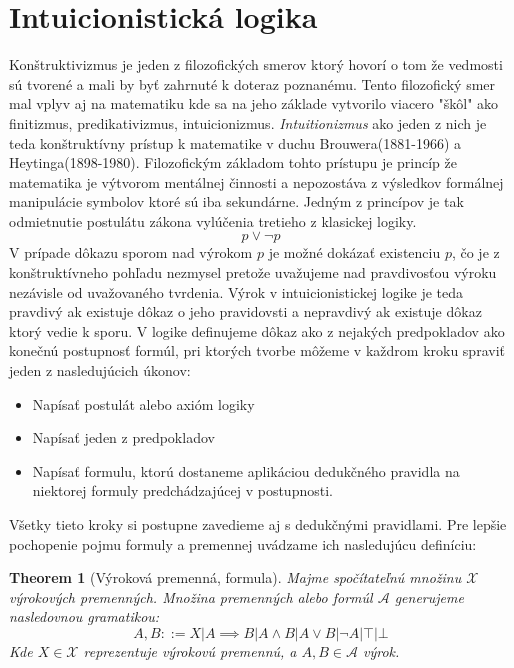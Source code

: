 \documentclass[a4paper,10pt,oneside]{report}%
\newtheorem{theorem}{Theorem}
\begin{document}
\section{Intuicionistická logika}
    Konštruktivizmus je jeden z filozofických smerov ktorý hovorí o tom že vedmosti
sú tvorené a mali by byť zahrnuté k doteraz poznanému.
    Tento filozofický smer mal vplyv aj na matematiku kde sa na jeho základe
vytvorilo viacero "škôl" ako finitizmus, predikativizmus, intuicionizmus.
    \emph{Intuitionizmus} ako jeden z nich je teda konštruktívny prístup k matematike
v duchu Brouwera(1881-1966) a Heytinga(1898-1980).
    Filozofickým základom tohto prístupu je princíp že matematika je výtvorom mentálnej
činnosti a nepozostáva z výsledkov formálnej manipulácie symbolov ktoré sú iba
sekundárne.
    Jedným z princípov je tak odmietnutie postulátu zákona vylúčenia tretieho
z klasickej logiky.
\begin{equation}
    p \vee \neg p
\end{equation}
    V prípade dôkazu sporom nad výrokom $p$ je možné dokázať existenciu $p$,
čo je z konštruktívneho pohľadu nezmysel pretože uvažujeme nad pravdivosťou
    výroku nezávisle od uvažovaného tvrdenia.
Výrok v intuicionistickej logike je teda pravdivý ak existuje dôkaz o jeho pravidovsti
a nepravdivý ak existuje dôkaz ktorý vedie k sporu.
    V logike definujeme dôkaz ako z nejakých predpokladov ako konečnú postupnosť
formúl, pri ktorých tvorbe môžeme v každrom kroku spraviť jeden z nasledujúcich
úkonov:
\begin{itemize}
    \item Napísať postulát alebo axióm logiky
    \item Napísať jeden z predpokladov
    \item Napísať formulu, ktorú dostaneme aplikáciou dedukčného pravidla na niektorej
formuly predchádzajúcej v postupnosti.
\end{itemize}
    Všetky tieto kroky si postupne zavedieme aj s dedukčnými pravidlami.
    Pre lepšie pochopenie pojmu formuly a premennej uvádzame ich nasledujúcu definíciu:
\begin{theorem}[Výroková premenná, formula]
    Majme spočítateľnú množinu $\mathcal{X}$ výrokových premenných. Množina premenných
    alebo formúl $\mathcal{A}$ generujeme nasledovnou gramatikou:
    \begin{equation}
        A, B ::= X | A \implies B | A \wedge B | A \vee B | \neg A | \top | \bot
    \end{equation}
    Kde $X \in \mathcal{X}$ reprezentuje výrokovú premennú, a $A, B \in \mathcal{A}$
    výrok.
\end{theorem}
\end{document}

